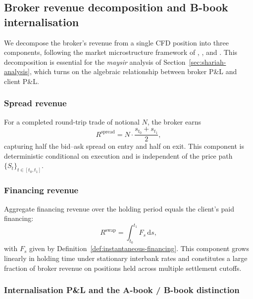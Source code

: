 \documentclass[preprint,12pt,authoryear]{elsarticle}
\newcommand{\dd}{\mathrm{d}}
\theoremstyle{definition}
\begin{document}
\subsection{Broker revenue decomposition and B-book internalisation}
\label{sec:broker}

We decompose the broker's revenue from a single CFD position into
three components, following the market microstructure framework of
\citet{OHara1995}, \citet{Harris2003}, and \citet{Menkveld2016}. This
decomposition is essential for the \emph{maysir} analysis of
Section~\ref{sec:shariah-analysis}, which turns on the algebraic
relationship between broker P\&L and client P\&L.

\subsubsection{Spread revenue}

For a completed round-trip trade of notional $N$, the broker earns
\begin{equation}
    R^{\text{spread}}
    = N \cdot \frac{s_{t_0} + s_{t_1}}{2},
    \label{eq:r-spread}
\end{equation}
capturing half the bid--ask spread on entry and half on exit. This
component is deterministic conditional on execution and is independent
of the price path $\{S_t\}_{t \in [t_0, t_1]}$.

\subsubsection{Financing revenue}

Aggregate financing revenue over the holding period equals the
client's paid financing:
\begin{equation}
    R^{\text{swap}}
    = \int_{t_0}^{t_1} F_s \, \dd s,
    \label{eq:r-swap}
\end{equation}
with $F_s$ given by Definition~\ref{def:instantaneous-financing}. This
component grows linearly in holding time under stationary interbank
rates and constitutes a large fraction of broker revenue on positions
held across multiple settlement cutoffs.

\subsubsection{Internalisation P\&L and the A-book / B-book distinction}
\end{document}
